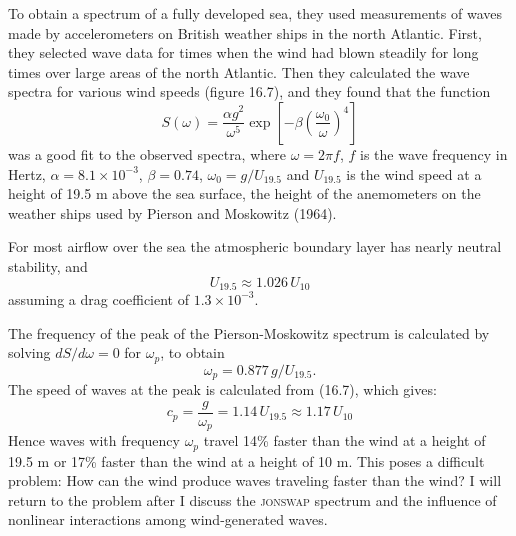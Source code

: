 To obtain a spectrum of a fully developed sea, they used measurements
of waves made by accelerometers on British weather ships in the north
Atlantic. First, they selected wave data for times when the wind had
blown steadily for long times over large areas of the north
Atlantic. Then they calculated the wave spectra for various wind
speeds (figure 16.7), and they found that the function
\begin{equation}
S(\omega) = \frac{\alpha g^{2}}{\omega ^{5}} \exp \left[ - \beta \left(
\frac{\omega _{0}}{\omega } \right) ^{4} \right]
\end{equation}
was a good fit to the observed spectra, where $\omega = 2\pi f$, $f$
is the wave frequency in Hertz, $\alpha = 8.1 \times 10^{-3}$, $\beta = 0.74 $,
$\omega _{0} = g/U_{19.5}$ and $U_{19.5}$ is the wind speed
at a height of 19.5 m above the sea surface, the height of the
anemometers on the weather ships used by Pierson and Moskowitz (1964).

For most airflow over the sea the atmospheric boundary layer has
nearly neutral stability, and
\begin{equation}
U_{19.5}\approx 1.026\, U_{10}
\end{equation}
assuming a drag coefficient of $1.3 \times 10^{-3}$.

The frequency of the peak of the Pierson-Moskowitz spectrum is
calculated by solving $dS/d\omega = 0$ for $\omega _{p}$, to obtain
\begin{equation}
\omega _{p} = 0.877 \,g/U_{19.5}.
\end{equation}
The speed of waves at the peak is calculated from (16.7), which gives:
\begin{equation}
c_{p} = \frac{g}{\omega _{p}} = 1.14 \, U_{19.5} \approx 1.17\,U_{10}
\end{equation}
Hence waves with frequency $\omega _{p}$ travel 14\% faster than the
wind at a height of 19.5 m or 17\% faster than the wind at a height of
10 m. This poses a difficult problem: How can the wind produce waves
traveling faster than the wind? I will return to the problem after I
discuss the \textsc{jonswap} spectrum and the influence of nonlinear
interactions among wind-generated waves.

